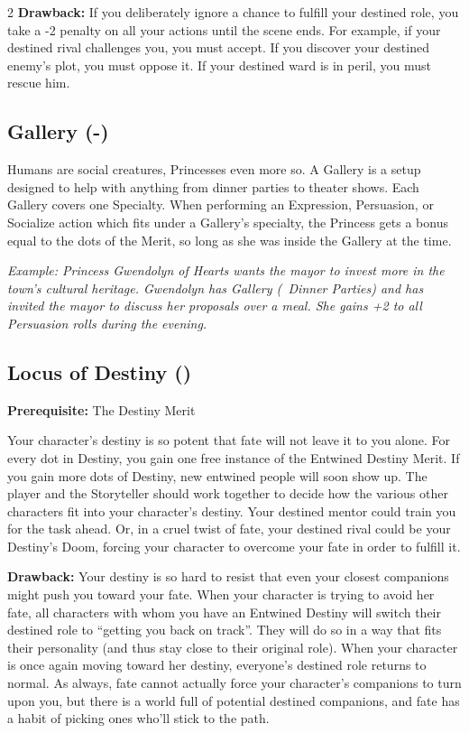 \begin{multicols}{2}
\textbf{Drawback:} If you deliberately ignore a chance to fulfill your destined role, you take a -2 penalty on all your actions until the scene ends. For example, if your destined rival challenges you, you must accept. If you discover your destined enemy's plot, you must oppose it. If your destined ward is in peril, you must rescue him.

\subsection*{Gallery (\textbullet\nobreak\hspace{.16667em}-\nobreak\hspace{.16667em}\textbullet\textbullet\textbullet)}

Humans are social creatures, Princesses even more so. A Gallery is a setup designed to help with anything from dinner parties to theater shows. Each Gallery covers one Specialty. When performing an Expression, Persuasion, or Socialize action which fits under a Gallery's specialty, the Princess gets a bonus equal to the dots of the Merit, so long as she was inside the Gallery at the time. 

\textit{Example: Princess Gwendolyn of Hearts wants the mayor to invest more in the town's cultural heritage. Gwendolyn has Gallery (\textbullet\textbullet\, Dinner Parties) and has invited the mayor to discuss her proposals over a meal. She gains +2 to all Persuasion rolls during the evening.}

\subsection*{Locus of Destiny (\textbullet\textbullet\textbullet\textbullet\textbullet)}

\textbf{Prerequisite:} The Destiny Merit

Your character's destiny is so potent that fate will not leave it to you alone. For every dot in Destiny, you gain one free instance of the Entwined Destiny Merit. If you gain more dots of Destiny, new entwined people will soon show up. The player and the Storyteller should work together to decide how the various other characters fit into your character's destiny. Your destined mentor could train you for the task ahead. Or, in a cruel twist of fate, your destined rival could be your Destiny's Doom, forcing your character to overcome your fate in order to fulfill it. 

\textbf{Drawback:} Your destiny is so hard to resist that even your closest companions might push you toward your fate. When your character is trying to avoid her fate, all characters with whom you have an Entwined Destiny will switch their destined role to \textquotedblleft getting you back on track\textquotedblright. They will do so in a way that fits their personality (and thus stay close to their original role). When your character is once again moving toward her destiny, everyone's destined role returns to normal. As always, fate cannot actually force your character's companions to turn upon you, but there is a world full of potential destined companions, and fate has a habit of picking ones who'll stick to the path.


\end{multicols}
